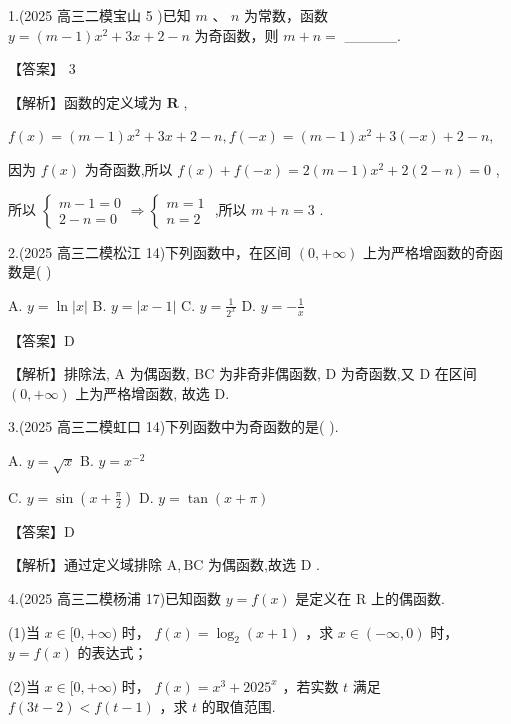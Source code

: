 \documentclass[10pt]{article}
\begin{document}
1.(2025 高三二模宝山 5 )已知 \(m\text{ 、 }n\) 为常数，函数 \(y = \left( {m - 1}\right) {x}^{2} + {3x} + 2 - n\) 为奇函数，则 \(m + n =\) \_\_\_\_\_.

【答案】 3

【解析】函数的定义域为 \(\mathbf{R}\) ,

\(f\left( x\right)  = \left( {m - 1}\right) {x}^{2} + {3x} + 2 - n,f\left( {-x}\right)  = \left( {m - 1}\right) {x}^{2} + 3\left( {-x}\right)  + 2 - n,\)

因为 \(f\left( x\right)\) 为奇函数,所以 \(f\left( x\right)  + f\left( {-x}\right)  = 2\left( {m - 1}\right) {x}^{2} + 2\left( {2 - n}\right)  = 0\) ,

所以 \(\left\{  {\begin{array}{l} m - 1 = 0 \\  2 - n = 0 \end{array} \Rightarrow  \left\{  \begin{array}{l} m = 1 \\  n = 2 \end{array}\right. }\right.\) ,所以 \(m + n = 3\) .

2.(2025 高三二模松江 14)下列函数中，在区间 \(\left( {0, + \infty }\right)\) 上为严格增函数的奇函数是( )

A. \(y = \ln \left| x\right|\) B. \(y = \left| {x - 1}\right|\) C. \(y = \frac{1}{{2}^{x}}\) D. \(y =  - \frac{1}{x}\)

【答案】D

【解析】排除法, A 为偶函数, BC 为非奇非偶函数, D 为奇函数,又 D 在区间 \(\left( {0, + \infty }\right)\) 上为严格增函数, 故选 D.

3.(2025 高三二模虹口 14)下列函数中为奇函数的是( ).

A. \(y = \sqrt{x}\) B. \(y = {x}^{-2}\)

C. \(y = \sin \left( {x + \frac{\pi }{2}}\right)\) D. \(y = \tan \left( {x + \pi }\right)\)

【答案】D

【解析】通过定义域排除 \(\mathrm{A},\mathrm{{BC}}\) 为偶函数,故选 \(\mathrm{D}\) .

4.(2025 高三二模杨浦 17)已知函数 \(y = f\left( x\right)\) 是定义在 \(\mathrm{R}\) 上的偶函数.

(1)当 \(x \in  \lbrack 0, + \infty )\) 时， \(f\left( x\right)  = {\log }_{2}\left( {x + 1}\right)\) ，求 \(x \in  \left( {-\infty ,0}\right)\) 时， \(y = f\left( x\right)\) 的表达式；

(2)当 \(x \in  \lbrack 0, + \infty )\) 时， \(f\left( x\right)  = {x}^{3} + {2025}^{x}\) ，若实数 \(t\) 满足 \(f\left( {{3t} - 2}\right)  < f\left( {t - 1}\right)\) ，求 \(t\) 的取值范围.
\end{document}
